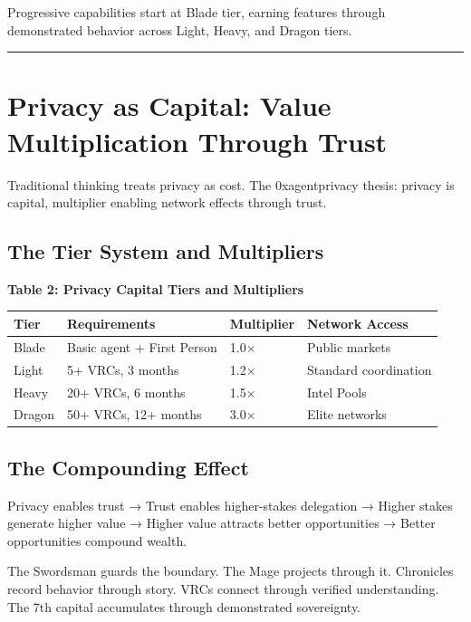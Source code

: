 \documentclass[
]{article}
\newcounter{none} %
\begin{document}
Progressive capabilities start at Blade tier, earning features through
demonstrated behavior across Light, Heavy, and Dragon tiers.

\begin{center}\rule{0.5\linewidth}{0.5pt}\end{center}

\section{Privacy as Capital: Value Multiplication Through
Trust}\label{privacy-as-capital-value-multiplication-through-trust}

Traditional thinking treats privacy as cost. The 0xagentprivacy thesis:
privacy is capital, multiplier enabling network effects through trust.

\subsection{The Tier System and
Multipliers}\label{the-tier-system-and-multipliers}

\textbf{Table 2: Privacy Capital Tiers and Multipliers}

{\def\LTcaptype{none} %
\begin{longtable}[]{@{}llll@{}}
\toprule\noalign{}
Tier & Requirements & Multiplier & Network Access \\
\midrule\noalign{}
\endhead
\bottomrule\noalign{}
\endlastfoot
Blade & Basic agent + First Person & 1.0× & Public markets \\
Light & 5+ VRCs, 3 months & 1.2× & Standard coordination \\
Heavy & 20+ VRCs, 6 months & 1.5× & Intel Pools \\
Dragon & 50+ VRCs, 12+ months & 3.0× & Elite networks \\
\end{longtable}
}

\subsection{The Compounding Effect}\label{the-compounding-effect}

Privacy enables trust → Trust enables higher-stakes delegation → Higher
stakes generate higher value → Higher value attracts better
opportunities → Better opportunities compound wealth.

The Swordsman guards the boundary. The Mage projects through it.
Chronicles record behavior through story. VRCs connect through verified
understanding. The 7th capital accumulates through demonstrated
sovereignty.
\end{document}
